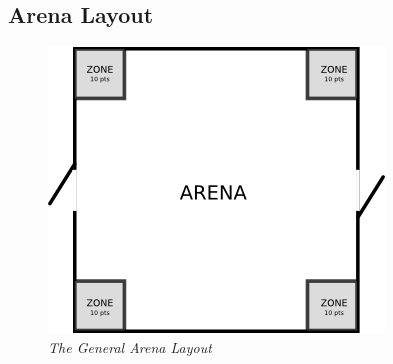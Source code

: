 \clearpage
\newpage

\subsection {Arena Layout}

\begin {figure}[h]
\begin {center}
\includegraphics[keepaspectratio, scale =1]{../arena/arenagame1.png}
\caption{\small{\emph{The General Arena Layout}}}
\label {fig:arena}
\end {center}
\end {figure}
